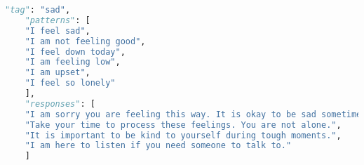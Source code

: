 \begin{lstlisting}[language=Python, caption=esempio breve di file JSON]
	"tag": "sad",
	"patterns": [
	"I feel sad",
	"I am not feeling good",
	"I feel down today",
	"I am feeling low",
	"I am upset",
	"I feel so lonely"
	],
	"responses": [
	"I am sorry you are feeling this way. It is okay to be sad sometimes.",
	"Take your time to process these feelings. You are not alone.",
	"It is important to be kind to yourself during tough moments.",
	"I am here to listen if you need someone to talk to."
	]
\end{lstlisting}
	